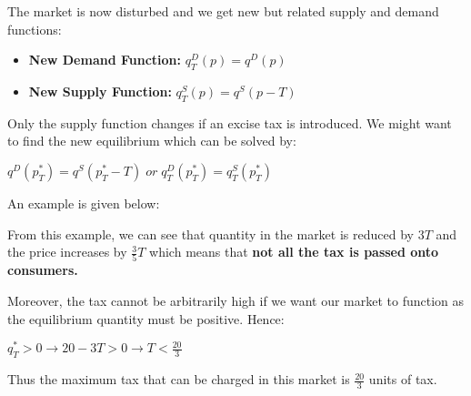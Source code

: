 \documentclass[12pt, letterpaper]{article}
\begin{document}
The market is now disturbed and we get new but related supply and demand functions:
\begin{itemize}
	\item \textbf{New Demand Function:} $q^D_T(p)=q^D(p)$
	\item \textbf{New Supply Function:} $q^S_T(p) = q^S(p-T)$
\end{itemize}
Only the supply function changes if an excise tax is introduced.
We might want to find the new equilibrium which can be solved by:
\begin{center}
	$q^D(p^*_T) = q^S(p^*_T-T) \;or\; q^D_T(p^*_T)=q^S_T(p^*_T)$
\end{center}
An example is given below:
\begin{center}
\end{center}
From this example, we can see that quantity in the market is reduced by $3T$ and the price increases by $\frac{3}{5}T$ which means that \textbf{not all the tax is passed onto consumers.}

Moreover, the tax cannot be arbitrarily high if we want our market to function as the equilibrium quantity must be positive. Hence:
\begin{center}
	$q^*_T > 0 \rightarrow 20-3T > 0 \rightarrow T<\frac{20}{3}$
\end{center}
Thus the maximum tax that can be charged in this market is $\frac{20}{3}$ units of tax.
\end{document}
